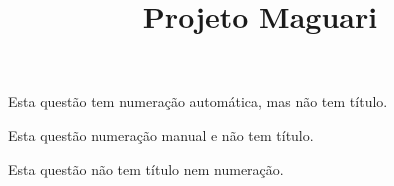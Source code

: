 \documentclass[a4paper,12pt]{article}
\title{Projeto Maguari}
\begin{document}
\maketitle

\questao
Esta questão tem numeração automática, mas não tem título.

\questao*[19]

Esta questão numeração manual e não tem título.


\questao*
Esta questão não tem título nem numeração.
\end{document}
